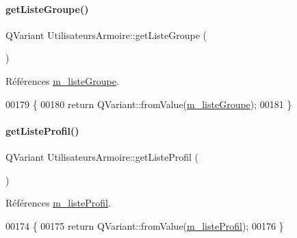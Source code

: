 \paragraph{\texorpdfstring{get\+Liste\+Groupe()}{getListeGroupe()}}
{\footnotesize\ttfamily Q\+Variant Utilisateurs\+Armoire\+::get\+Liste\+Groupe (\begin{DoxyParamCaption}{ }\end{DoxyParamCaption})}



Références \hyperlink{class_utilisateurs_armoire_a85558a0f373c06315c3c5f2e4e9e660c}{m\+\_\+liste\+Groupe}.


\begin{DoxyCode}
00179 \{
00180     \textcolor{keywordflow}{return} QVariant::fromValue(\hyperlink{class_utilisateurs_armoire_a85558a0f373c06315c3c5f2e4e9e660c}{m\_listeGroupe});
00181 \}
\end{DoxyCode}
\mbox{\label{class_utilisateurs_armoire_a153930c5840343585f2d0195405df382}} 
\paragraph{\texorpdfstring{get\+Liste\+Profil()}{getListeProfil()}}
{\footnotesize\ttfamily Q\+Variant Utilisateurs\+Armoire\+::get\+Liste\+Profil (\begin{DoxyParamCaption}{ }\end{DoxyParamCaption})}



Références \hyperlink{class_utilisateurs_armoire_a0687ace99585d71b2636feaf2163b905}{m\+\_\+liste\+Profil}.


\begin{DoxyCode}
00174 \{
00175     \textcolor{keywordflow}{return} QVariant::fromValue(\hyperlink{class_utilisateurs_armoire_a0687ace99585d71b2636feaf2163b905}{m\_listeProfil});
00176 \}
\end{DoxyCode}
\mbox{\label{class_utilisateurs_armoire_a39e5692fe0b00097732bb7633ae5d1e5}} 
